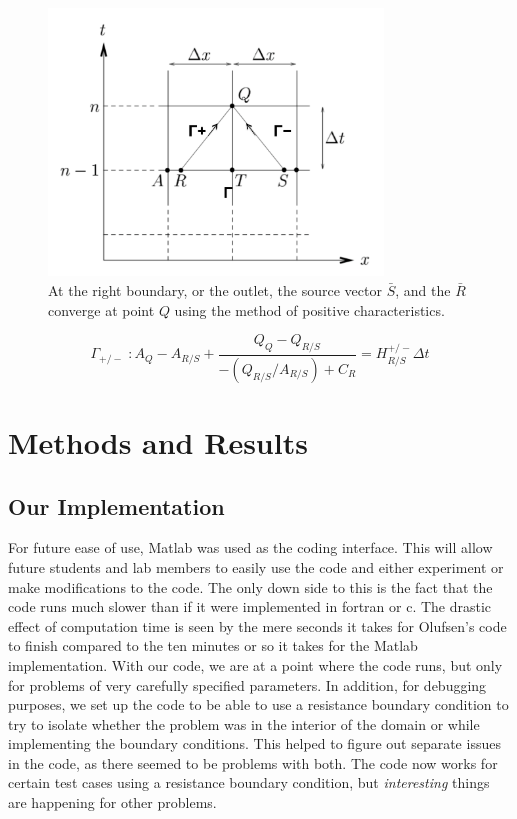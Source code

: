 \documentclass[12pt]{article}
\newcommand{\tensor}[1]{\bar{#1}}
\begin{document}
\begin{figure}[ht]
	\centering
	\label{characteristicplot}
	\includegraphics[width=3.5in]{characterplot}
	\caption{At the right boundary, or the outlet, the source vector $\tensor{S}$, and the $\tensor{R}$ converge at point $Q$ using the method of positive characteristics.~\cite{olufsenthesis}}
\end{figure}

 \begin{equation}
 	\label{characteristics}
 	\Gamma_{+/-}\; : A_Q - A_{R/S} + \frac{Q_Q - Q_{R/S}}{-(Q_{R/S}/A_{R/S}) + C_R} = H_{R/S}^{+/-} \Delta t
\end{equation}

\section{Methods and Results}
\subsection{Our Implementation}
For future ease of use, Matlab was used as the coding interface. This will allow future students and lab members to easily use the code and either experiment or make modifications to the code. The only down side to this is the fact that the code runs much slower than if it were implemented in fortran or c. The drastic effect of computation time is seen by the mere seconds it takes for Olufsen's code to finish compared to the ten minutes or so it takes for the Matlab implementation. With our code, we are at a point where the code runs, but only for problems of very carefully specified parameters. In addition, for debugging purposes, we set up the code to be able to use a resistance boundary condition to try to isolate whether the problem was in the interior of the domain or while implementing the boundary conditions. This helped to figure out separate issues in the code, as there seemed to be problems with both. The code now works for certain test cases using a resistance boundary condition, but \textit{interesting} things are happening for other problems.\\
\end{document}
